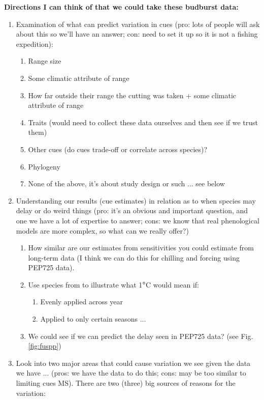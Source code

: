 \documentclass[11pt,letterpaper]{article}
\begin{document}
{\bf Directions I can think of that we could take these budburst data:}
\begin{enumerate}
\item Examination of what can predict variation in cues (pro: lots of people will ask about this so we'll have an answer; con: need to set it up so it is not a fishing expedition):
\begin{enumerate}
\item Range size
\item Some climatic attribute of range
\item How far outside their range the cutting was taken + some climatic attribute of range
\item Traits (would need to collect these data ourselves and then see if we trust them)
\item Other cues (do cues trade-off or correlate across species)?
\item Phylogeny
\item None of the above, it's about study design or such ... see below %
\end{enumerate}
\item Understanding our results (cue estimates) in relation as to when species may delay or do weird things (pro: it's an obvious and important question, and one we have a lot of expertise to answer; cons: we know that real phenological models are more complex, so what can we really offer?) 
\begin{enumerate}
\item How similar are our estimates from sensitivities you could estimate from long-term data (I think we can do this for chilling and forcing using PEP725 data).
\item Use species from \citep{fu2015} to illustrate what 1$\degree$C would mean if:
\begin{enumerate}
\item Evenly applied across year
\item Applied to only certain seasons ... 
\end{enumerate}
\item We could see if we can predict the delay seen in PEP725 data? (see Fig. \ref{fig:fuspp})
\end{enumerate}
\item Look into two major areas that could cause variation we see given the data we have ... (pros: we have the data to do this; cons: may be too similar to limiting cues MS). There are two (three) big sources of reasons for the variation:

\end{enumerate}
\end{document}
